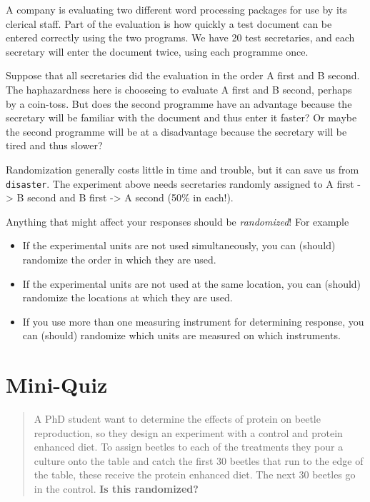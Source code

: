 \documentclass[
]{book}
\providecommand{\tightlist}{%
  \setlength{\itemsep}{0pt}\setlength{\parskip}{0pt}}
\begin{document}
A company is evaluating two different word processing packages for use by its clerical staff. Part of the evaluation is how quickly a test document can be entered correctly using the two programs. We have 20 test secretaries, and each secretary will enter the document twice, using each programme once.

Suppose that all secretaries did the evaluation in the order A first and B second. The haphazardness here is chooseing to evaluate A first and B second, perhaps by a coin-toss. But does the second programme have an advantage because the secretary will be familiar with the document and thus enter it faster? Or maybe the second programme will be at a disadvantage because the secretary will be tired and thus slower?

Randomization generally costs little in time and trouble, but it can save us from \texttt{disaster}. The experiment above needs secretaries randomly assigned to A first -\textgreater{} B second and B first -\textgreater{} A second (50\% in each!).

Anything that might affect your responses should be \emph{randomized}! For example

\begin{itemize}
\tightlist
\item
  If the experimental units are not used simultaneously, you can (should) randomize the order in which they are used.
\item
  If the experimental units are not used at the same location, you can (should) randomize the locations at which they are used.
\item
  If you use more than one measuring instrument for determining response, you can (should) randomize which units are measured on which instruments.
\end{itemize}

\hypertarget{mini-quiz}{%
\section{Mini-Quiz}\label{mini-quiz}}

\begin{quote}
A PhD student want to determine the effects of protein on beetle reproduction, so they design an experiment with a control and protein enhanced diet. To assign beetles to each of the treatments they pour a culture onto the table and catch the first 30 beetles that run to the edge of the table, these receive the protein enhanced diet. The next 30 beetles go in the control. \textbf{Is this randomized?}
\end{quote}
\end{document}
